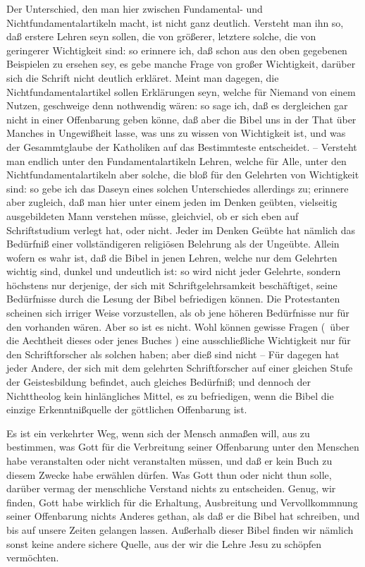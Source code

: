 \begin{aufza}
\item[\RWbet{Widerlegung.}] Der Unterschied, den man hier zwischen Fundamental- und Nichtfundamentalartikeln macht, ist nicht ganz deutlich. Versteht man ihn so, daß erstere Lehren seyn sollen, die von größerer, letztere solche, die von geringerer Wichtigkeit sind: so erinnere ich, daß schon aus den oben gegebenen Beispielen zu ersehen sey, es gebe manche Frage von großer Wichtigkeit, darüber sich die Schrift nicht deutlich erkläret. Meint man dagegen, die Nichtfundamentalartikel sollen Erklärungen seyn, welche für Niemand von einem Nutzen, geschweige denn nothwendig wären: so sage ich, daß es dergleichen gar nicht in einer Offenbarung geben könne, daß aber die Bibel uns in der That über Manches in Ungewißheit lasse, was uns zu wissen von Wichtigkeit ist, und was der Gesammtglaube der Katholiken auf das Bestimmteste entscheidet. -- Versteht man endlich unter den Fundamentalartikeln Lehren, welche für Alle, unter den Nichtfundamentalartikeln aber solche, die bloß für den Gelehrten von Wichtigkeit sind: so gebe ich das Daseyn eines solchen Unterschiedes allerdings zu; erinnere aber zugleich, daß man hier unter einem  jeden im Denken geübten, vielseitig ausgebildeten Mann verstehen müsse, gleichviel, ob er sich eben auf Schriftstudium verlegt hat, oder nicht. Jeder im Denken Geübte hat nämlich das Bedürfniß einer vollständigeren religiösen Belehrung als der Ungeübte. Allein wofern es wahr ist, daß die Bibel in jenen Lehren, welche nur dem Gelehrten wichtig sind, dunkel und undeutlich ist: so wird nicht jeder Gelehrte, sondern höchstens nur derjenige, der sich mit Schriftgelehrsamkeit beschäftiget, seine Bedürfnisse durch die Lesung der Bibel befriedigen können. Die Protestanten scheinen sich irriger Weise vorzustellen, als ob jene höheren Bedürfnisse nur für den  vorhanden wären. Aber so ist es nicht. Wohl können gewisse Fragen (\zB\ über die Aechtheit dieses oder jenes Buches \udgl ) eine ausschließliche Wichtigkeit nur für den Schriftforscher als solchen haben; aber dieß sind nicht --  Für  dagegen hat jeder Andere, der sich mit dem gelehrten Schriftforscher auf einer gleichen Stufe der Geistesbildung befindet, auch gleiches Bedürfniß; und dennoch der Nichttheolog kein hinlängliches Mittel, es zu befriedigen, wenn die Bibel die einzige Erkenntnißquelle der göttlichen Offenbarung ist.
\item {} Es ist ein verkehrter Weg, wenn sich der Mensch anmaßen will, aus   zu bestimmen, was Gott für die Verbreitung seiner Offenbarung unter den Menschen habe veranstalten oder nicht veranstalten müssen, und daß er kein Buch zu diesem Zwecke habe erwählen dürfen. Was Gott thun oder nicht thun solle, darüber vermag der menschliche Verstand nichts zu entscheiden. Genug, wir finden, Gott habe wirklich für die Erhaltung, Ausbreitung und Vervollkommnung seiner Offenbarung nichts Anderes gethan, als daß er die Bibel hat schreiben, und bis auf unsere Zeiten gelangen lassen. Außerhalb dieser Bibel finden wir nämlich sonst keine andere sichere Quelle, aus der wir die Lehre Jesu zu schöpfen vermöchten.

\end{aufza}
